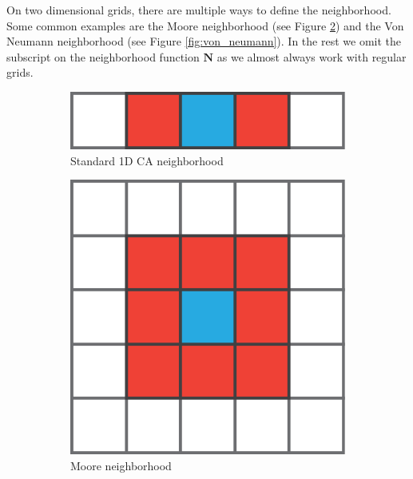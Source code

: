 On two dimensional grids, there are multiple ways to define the neighborhood.
Some common examples are the Moore neighborhood (see Figure \ref{fig:moore}) and
the Von Neumann neighborhood (see Figure \ref{fig:von_neumann}). In the rest we
omit the subscript on the neighborhood function $\boldsymbol{N}$ as we almost
always work with regular grids.

\begin{figure}[htbp]
  \centering
  \begin{subfigure}[c]{.3\linewidth}
    \centering
    \includegraphics[width=\linewidth]{figures/1d_neigh}
    \caption{Standard 1D \ac{CA} neighborhood}
    \label{fig:1d_neigh}
  \end{subfigure}
  \begin{subfigure}[c]{.3\linewidth}
    \centering
    \includegraphics[width=\linewidth]{figures/moore}
    \caption{Moore neighborhood}
    \label{fig:moore}
  \end{subfigure}
  \begin{subfigure}[c]{.3\linewidth}

\end{subfigure}
\end{figure}
